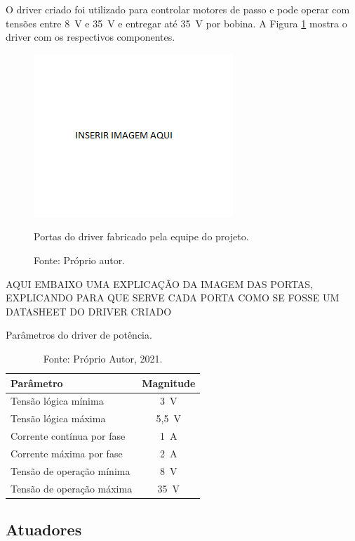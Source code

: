 O driver criado foi utilizado para controlar motores de passo e pode operar com tensões entre 8~V e 35~V e 
entregar até 35~V por bobina. A Figura \ref{fig:driverportas} mostra o driver com os respectivos componentes.

\begin{figure}[!htb]
\centering
\includegraphics[scale = 0.2]{figuras/driverportas}
\caption{Portas do driver fabricado pela equipe do projeto.}
\caption*{Fonte: Próprio autor.}
\label{fig:driverportas}
\end{figure}
    
AQUI EMBAIXO UMA EXPLICAÇÃO DA IMAGEM DAS PORTAS, EXPLICANDO PARA QUE SERVE CADA PORTA COMO SE 
FOSSE UM DATASHEET DO DRIVER CRIADO

\begin{table}
    \centering
    \caption{Parâmetros do driver de potência.}
    \begin{tabular}{lc}
        \hline
        \textbf{Parâmetro} & \textbf{Magnitude}\\
        \hline
        Tensão lógica mínima & 3~V\\
        Tensão lógica máxima & 5,5~V\\
        Corrente contínua por fase & 1~A\\
        Corrente máxima por fase & 2~A\\
        Tensão de operação mínima & 8~V\\
        Tensão de operação máxima & 35~V\\ 
        \hline       
    \end{tabular}
    \caption*{Fonte: Próprio Autor, 2021.}
    \label{tab:pdriver}
\end{table}

\subsection{Atuadores}\label{subsec:metatuadores}

